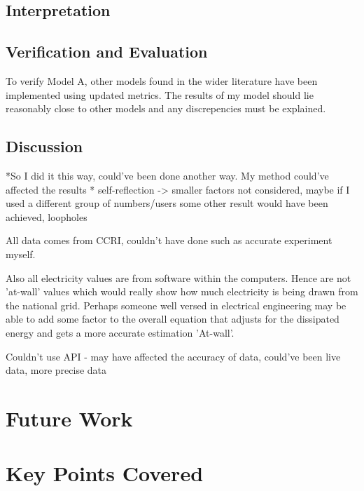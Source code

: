 \subsection{Interpretation}


\subsection{Verification and Evaluation}

To verify Model A, other models found in the wider literature have been implemented using updated metrics. The results of my model should lie reasonably close to other models and any discrepencies must be explained. 


\subsection{Discussion}
*So I did it this way, could've been done another way. My method could've affected the results
* self-reflection -> smaller factors not considered, maybe if I used a different group of numbers/users some other result would have been achieved, loopholes

All data comes from CCRI, couldn't have done such as accurate experiment myself.

Also all electricity values are from software within the computers. Hence are not 'at-wall' values which would really show how much electricity is being drawn from the national grid. Perhaps someone well versed in electrical engineering may be able to add some factor to the overall equation that adjusts for the dissipated energy and gets a more accurate estimation 'At-wall'.

Couldn't use API - may have affected the accuracy of data, could've been live data, more precise data




\section{Future Work}
\section{Key Points Covered}
